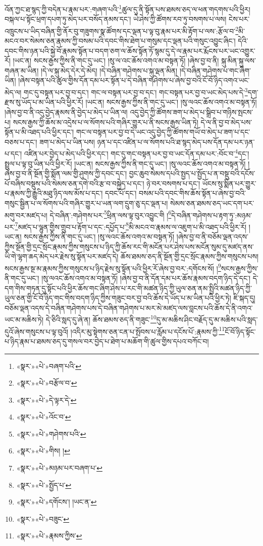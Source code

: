 འོན་ཀྱང་ཐ་སྙད་ཀྱི་བདེན་པ་རྣམ་པར་:གཞག་པའི་\footnote{«སྣར་»«པེ་»བཞག་པའི་}ཚུལ་དུ་ནི་སྟོན་པས་ཐམས་ཅད་ལ་ཕན་གདགས་པའི་ཕྱིར། བསྐལ་པ་སྟོང་ཕྲག་དཔག་ཏུ་མེད་པར་བསོད་ནམས་དང་། ཡེ་ཤེས་ཀྱི་ཚོགས་རབ་ཏུ་བསགས་པ་ལས། ངེས་པར་འཁྲུངས་པ་ཡིད་བཞིན་གྱི་ནོར་བུ་གཟུགས་སྣ་ཚོགས་དང་ལྡན་པ་ལྟ་བུ་རྣམ་པར་མི་རྟོག་པ་ལས་:རྩོལ་བ་\footnote{«སྣར་»«པེ་»བརྩོལ་བ་}མི་མངའ་བར་སེམས་ཅན་རྣམས་ཀྱི་བསམ་པའི་དབང་གིས་ཐེག་པ་གསུམ་དང་ལྡན་པའི་གསུང་འབྱུང་ཞིང་། དེའི་དབང་གིས་ཉན་པའི་སྐྱེ་བོ་རྣམས་སྟོན་པ་བདག་ཅག་ལ་ཆོས་སྟོན་ཏོ་སྙམ་དུ་དེ་ལ་རྣམ་པར་རྨོངས་པར་ཡང་འགྱུར་རོ། །ཡང་ན། སངས་རྒྱས་ཀྱིས་ནི་གང་དུ་ཡང་། །སུ་ལ་འང་ཆོས་འགའ་མ་བསྟན་ཏོ། །ཞེས་བྱ་བ་ནི། སྐུ་མིན་སྐུ་ལས་གཞན་མ་ཡིན། །དེ་ལ་སྐུ་མེད་དེར་དེ་མེད། །དེ་བཞིན་གཤེགས་པ་སྐུ་ལྡན་མིན། །དེ་བཞིན་གཤེགས་པ་གང་ཞིག་ཡིན། །ཞེས་བསྟན་པའི་ཚུལ་གྱིས་དོན་དམ་པར་སྟོན་པ་དེ་བཞིན་གཤེགས་པ་ཞེས་བྱ་བའི་ངོ་བོ་ཉིད་འགའ་ཡང་མེད་ལ། གང་དུ་བསྟན་པར་བྱ་བ་དང་། གང་ལ་བསྟན་པར་བྱ་བ་དང་། གང་བསྟན་པར་བྱ་བ་ཡང་མེད་པས་དེ་\footnote{«སྣར་»«པེ་»དེ་ལྟར་དེ་}དག་རྫས་སུ་ཡོད་པ་མ་ཡིན་པའི་ཕྱིར་རོ། །ཡང་ན། སངས་རྒྱས་ཀྱིས་ནི་གང་དུ་ཡང་། །སུ་ལའང་ཆོས་འགའ་མ་བསྟན་ཏོ། །ཞེས་བྱ་བ་ནི་འདུ་བྱེད་རྣམས་ནི་བྱེད་པ་མེད་པ་ཡིན་ལ། འདུ་བྱེད་ཀྱི་ཚོགས་ཟག་པ་མེད་པ་སྒྲིབ་པ་གཉིས་སྤངས་པ། སངས་རྒྱས་ཀྱི་ཆོས་མ་འདྲེས་པ་ལ་སོགས་པའི་གཞིར་གྱུར་པ་ནི་སངས་རྒྱས་ཡིན་ཏེ། དེ་ལ་ནི་བྱ་བ་མེད་པས་སྟོན་པ་མི་འཐད་པའི་ཕྱིར་དང་། གང་ལ་བསྟན་པར་བྱ་བ་དེ་ཡང་འདུ་བྱེད་ཀྱི་ཚོགས་གཡོ་བ་མེད་པ་ཟག་པ་དང་བཅས་པ་དང་། ཟག་པ་མེད་པ་ཡིན་པས། ཉན་པ་དང་འཛིན་པ་ལ་སོགས་པའི་ཐ་སྙད་མེད་པས་དོན་དམ་པར་ཉན་པ་དང་། འཛིན་པར་བྱེད་པ་མེད་པའི་ཕྱིར་དང་། གང་དུ་གང་བསྟན་པར་བྱ་བ་ཡང་དོན་དམ་པར་:བོང་བ་\footnote{«སྣར་»«པེ་»འོང་བ་}དང་། སྤྲུལ་པ་ལྟ་བུ་ཡིན་པའི་ཕྱིར་རོ། །ཡང་ན། སངས་རྒྱས་ཀྱིས་ནི་གང་དུ་ཡང་། །སུ་ལའང་ཆོས་འགའ་མ་བསྟན་ཏོ། །ཞེས་བྱ་བ་ནི་སྔོན་གྱི་སྨོན་ལམ་གྱི་ཤུགས་ཀྱི་དབང་དང་། བྱང་ཆུབ་སེམས་དཔའི་སྤྱད་པ་སྤྱོད་པ་ན་བསྡུ་བའི་དངོས་པོ་བཞིས་བསྡུས་པའི་སེམས་ཅན་དགེ་བའི་རྩ་བ་བསྐྱེད་པ་དང་། ཉེ་བར་བསགས་པ་དང་། ཡོངས་སུ་སྨིན་པར་གྱུར་པ་རྣམས་ཀྱི་རྒྱུའི་མཐུ་ཉིད་ལས་མོས་པ་དང་། དབང་པོ་དང་། བསམ་པའི་དབང་གིས་ཆོས་སྟོན་པ་ཞེས་བྱ་བའི་གསུང་སྦྱིན་པ་ལ་སོགས་པའི་གཞིར་གྱུར་པ་ཡན་ལག་དྲུག་ཅུ་དང་ལྡན་པ། སེམས་ཅན་ཐམས་ཅད་ཡང་དག་པར་མགུ་བར་མཛད་པ། དེ་བཞིན་:གཤེགས་པར་\footnote{«སྣར་»«པེ་»གཤེགས་པའི་}ཕྲིན་ལས་ལྟ་བུར་འབྱུང་གི །\footnote{«སྣར་»«པེ་»གིས། །}དེ་བཞིན་གཤེགས་པ་རྟག་ཏུ་:མཉམ་པར་\footnote{«སྣར་»«པེ་»མཉམ་པར་བཞག་པ་}མཛད་པ་ལྷུན་གྱིས་གྲུབ་པ་རྟོག་པ་དང་:དཔྱོད་པ་\footnote{«སྣར་»«པེ་»སྤྱོད་པ་}མི་མངའ་བ་རྣམས་ལ་འཇུག་པ་མི་འཐད་པའི་ཕྱིར་རོ། །ཡང་ན། སངས་རྒྱས་ཀྱིས་ནི་གང་དུ་ཡང་། །སུ་ལའང་ཆོས་འགའ་མ་བསྟན་ཏོ། །ཞེས་བྱ་བ་ནི་བཅོམ་ལྡན་འདས་ཀྱིས་སྔོན་གྱི་དྲང་སྲོང་རྣམས་ཀྱིས་གསུངས་པ་ཉིད་ཀྱི་ཆོས་རང་གི་མངོན་པར་ཤེས་པས་མངོན་སུམ་དུ་མཛད་ནས་ཡི་གེ་ལྷག་ཆད་མེད་པར་རྗེས་སུ་སྟོན་པར་མཛད་དེ། ཆོས་ཐམས་ཅད་ནི་སྔོན་གྱི་དྲང་སྲོང་རྣམས་ཀྱིས་གསུངས་པས། སངས་རྒྱས་སྔ་མ་རྣམས་ཀྱིས་གསུངས་པ་ཉིད་རྗེས་སུ་སྟོན་པའི་ཕྱིར་རོ་ཞེས་བྱ་བར་:དགོངས་སོ། །\footnote{«སྣར་»«པེ་»དགོངས་། །ཡང་ན་}སངས་རྒྱས་ཀྱིས་ནི་གང་དུ་ཡང་། །སུ་ལའང་ཆོས་འགའ་མ་བསྟན་ཏོ། །ཞེས་བྱ་བ་ནི་དོན་དམ་པར་ཆོས་རྣམས་བདག་ཉིད་དེ་དང་། དེ་དག་གིས་གཏན་དུ་སྟོང་པའི་ཕྱིར་ཆོས་གང་ཞིག་ཤེས་པ་རང་གི་མཚན་ཉིད་ཀྱི་ཡུལ་ཅན་ནམ་སྤྱིའི་མཚན་ཉིད་ཀྱི་ཡུལ་ཅན་གྱི་ངོ་བོ་ཉིད་གང་གིས་བདག་ཉིད་ཀྱིས་གཟུང་བར་བྱ་བའི་ཆོས་དེ་ཡོད་པ་མ་ཡིན་པའི་ཕྱིར་ཏེ། ཇི་སྐད་དུ། བཅོམ་ལྡན་འདས་དེ་བཞིན་གཤེགས་པས་དེ་བཞིན་གཤེགས་པ་མར་མེ་མཛད་ལས་བླངས་པའི་ཆོས་དེ་ནི་འགའ་ཡང་མ་མཆིས་ཏེ། དེ་ཅིའི་སླད་དུ་ཞེ་ན། ཆོས་ཐམས་ཅད་ནི་གཟུང་\footnote{«སྣར་»«པེ་»བཟུང་}དུ་མ་མཆིས་ཤིང་བརྗོད་དུ་མ་མཆིས་པའི་སླད་དུའོ་ཞེས་གསུངས་པ་ལྟ་བུའོ། །འདིར་མུ་སྟེགས་ཅན་ངན་པ་སྤོབས་པ་རློམ་པ་དངོས་པོ་:རྣམས་ཀྱི་\footnote{«སྣར་»«པེ་»རྣམས་ཀྱིས་}ངོ་བོ་ཉིད་སྟོང་པ་ཉིད་རྣམ་པ་ཐམས་ཅད་དུ་གསལ་བར་བྱེད་པ་ཐེག་པ་མཆོག་གི་ཚུལ་གྱིས་དཔའ་བཀོང་བ། 